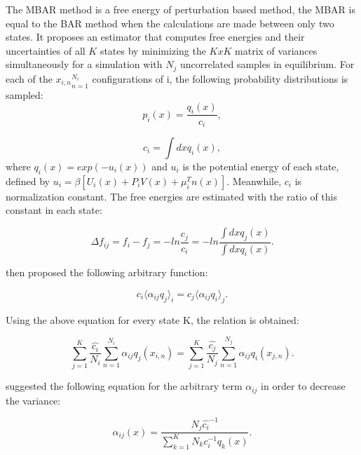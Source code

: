 	The MBAR method is a free energy of perturbation based method, the MBAR is equal to the BAR method when the calculations are made between only two states. It proposes an estimator that computes free energies and their uncertainties of all $K$ states  by minimizing the $KxK$ matrix of variances simultaneously for a simulation with $N_{j}$ uncorrelated samples in equilibrium. For each of the ${x_{i,n}}_{n=1}^{N_{i}}$ configurations of i, the following probability distributions is sampled:
	\begin{equation}
	p_{i}(x) = \frac{q_{i}(x)}{c_{i}},
	\end{equation}
	
	\begin{equation}
	c_{i} = \int dx q_{i}(x),
	\end{equation}
	where $q_{i}(x)=exp(-u_{i}(x))$ and $u_{i}$ is the potential energy of each state, defined by $u_{i}= \beta [U_{i}(x)+P_{i}V(x) + \mu _{i}^{T}n(x)]$. Meanwhile, $c_{i}$ is normalization constant.  The free energies are estimated with the ratio of this constant in each state:
	
	\begin{equation}
	\Delta f_{ij} = f_{i} - f_{j} = - ln \frac{c_{j}}{c_{i}}  = -ln \frac{\int dx q_{j}(x)}{\int dx q_{i}(x)} .
	\end{equation}
	
	 then proposed the following arbitrary function:
	
	\begin{equation}
	c_{i} \langle \alpha _{ij} q_{j} \rangle _{i}  =  c_{j} \langle \alpha _{ij} q_{i} \rangle _{j} .
	\end{equation}
	
	Using the above equation for every state  K, the relation is obtained:
	
	\begin{equation}
	\label{eq:mbar1}
	\sum_{j=1}^{K} \frac{\hat{c_{i}}}{N_{i}} \sum_{n=1}^{N_{i}} \alpha _{ij} q_{j} (x_{i,n}) =  \sum_{j=1}^{K} \frac{\hat{c_{j}}}{N_{j}} \sum_{n=1}^{N_{j}} \alpha _{ij} q_{i} (x_{j,n}) .
	\end{equation}
	
	 suggested the following equation for the arbitrary term $\alpha _{ij}$ in order to decrease the variance:
	
	\begin{equation}
	\label{eq:mbar2}
	\alpha _{ij} (x) = \frac{N_{j} \hat{c_{i}} ^{-1}}{\sum_{k=1}^{K} N_{k} c_{i} ^{-1} q_{k}(x)} .
	\end{equation}
	
